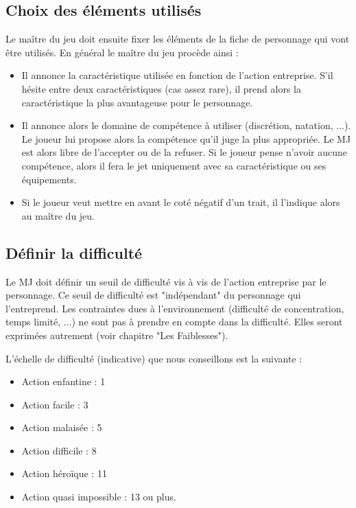\subsection{Choix des éléments utilisés}

Le maître du jeu doit ensuite fixer les éléments de la fiche de personnage qui vont être utilisés. En général le maître du jeu procède ainsi :

\begin{itemize}
\item Il annonce la caractéristique utilisée en fonction de l'action entreprise. S'il hésite entre deux caractéristiques (cas assez rare), il prend alors la caractéristique la plus avantageuse pour le personnage.
\item Il annonce alors le domaine de compétence à utiliser (discrétion, natation, ...). Le joueur lui propose alors la compétence qu'il juge la plus appropriée. Le MJ est alors libre de l'accepter ou de la refuser. Si le joueur pense n'avoir aucune compétence, alors il fera le jet uniquement avec sa caractéristique ou ses équipements.
\item Si le joueur veut mettre en avant le coté négatif d'un trait, il l'indique alors au maître du jeu.
\end{itemize}

\subsection{Définir la difficulté}

Le MJ doit définir un seuil de difficulté vis à vis de l'action entreprise par le personnage. Ce seuil de difficulté est "indépendant" du personnage qui l'entreprend. Les contraintes dues à l'environnement (difficulté de concentration, temps limité, ...) ne sont pas à prendre en compte dans la difficulté. Elles seront exprimées autrement (voir chapitre "Les Faiblesses").

L'échelle de difficulté (indicative) que nous conseillons est la suivante :

\begin{itemize}
\item Action enfantine : 1
\item Action facile : 3
\item Action malaisée : 5
\item Action difficile : 8
\item Action héroïque : 11
\item Action quasi impossible : 13 ou plus.
\end{itemize}

